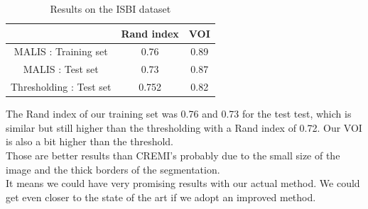 \begin{table}[!htbp]
	\centering
	\begin{tabular}{|c|c|c|}
		\hline
		& Rand index & VOI \\
		\hline
		MALIS : Training set & 0.76 & 0.89\\
		\hline
		MALIS : Test set & 0.73 & 0.87\\
		\hline
		Thresholding : Test set & 0.752 & 0.82\\
		\hline
	\end{tabular}
	\caption{Results on the ISBI dataset}
	\label{tab:isbi_res}
\end{table}

The Rand index of our training set was 0.76 and 0.73 for the test test, which is similar but still higher than the thresholding with a Rand index of 0.72.
Our VOI is also a bit higher than the threshold.\\
Those are better results than CREMI's probably due to the small size of the image and the thick borders of the segmentation.\\ 
It means we could have very promising results with our actual method.
We could get even closer to the state of the art if we adopt an improved method.\\


